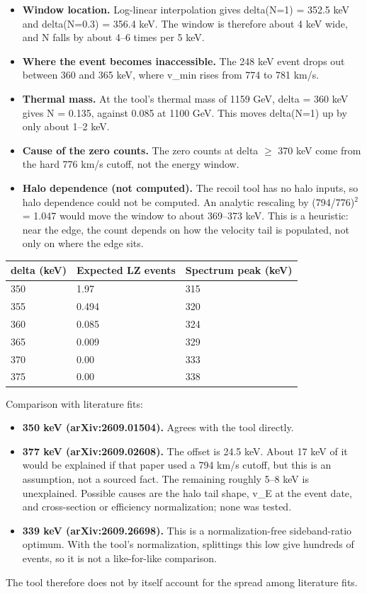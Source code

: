 \documentclass[11pt,a4paper]{article}
\begin{document}
\begin{itemize}
  \item \textbf{Window location.} Log-linear interpolation gives delta(N=1) = 352.5 keV and delta(N=0.3) = 356.4 keV. The window is therefore about 4 keV wide, and N falls by about 4--6 times per 5 keV.
  \item \textbf{Where the event becomes inaccessible.} The 248 keV event drops out between 360 and 365 keV, where v\_min rises from 774 to 781 km/s.
  \item \textbf{Thermal mass.} At the tool's thermal mass of 1159 GeV, delta = 360 keV gives N = 0.135, against 0.085 at 1100 GeV. This moves delta(N=1) up by only about 1--2 keV.
  \item \textbf{Cause of the zero counts.} The zero counts at delta $\geq$ 370 keV come from the hard 776 km/s cutoff, not the energy window.
  \item \textbf{Halo dependence (not computed).} The recoil tool has no halo inputs, so halo dependence could not be computed. An analytic rescaling by (794/776)$^2$ = 1.047 would move the window to about 369--373 keV. This is a heuristic: near the edge, the count depends on how the velocity tail is populated, not only on where the edge sits.
\end{itemize}
\begin{longtable}{@{}p{}p{}p{}@{}}
\toprule
\textbf{delta (keV)} & \textbf{Expected LZ events} & \textbf{Spectrum peak (keV)} \\ \midrule \endhead
350 & 1.97 & 315 \\
355 & 0.494 & 320 \\
360 & 0.085 & 324 \\
365 & 0.009 & 329 \\
370 & 0.00 & 333 \\
375 & 0.00 & 338 \\
\bottomrule\end{longtable}
Comparison with literature fits:

\begin{itemize}
  \item \textbf{350 keV (arXiv:2609.01504).} Agrees with the tool directly.
  \item \textbf{377 keV (arXiv:2609.02608).} The offset is 24.5 keV. About 17 keV of it would be explained if that paper used a 794 km/s cutoff, but this is an assumption, not a sourced fact. The remaining roughly 5--8 keV is unexplained. Possible causes are the halo tail shape, v\_E at the event date, and cross-section or efficiency normalization; none was tested.
  \item \textbf{339 keV (arXiv:2609.26698).} This is a normalization-free sideband-ratio optimum. With the tool's normalization, splittings this low give hundreds of events, so it is not a like-for-like comparison.
\end{itemize}
The tool therefore does not by itself account for the spread among literature fits.
\end{document}
